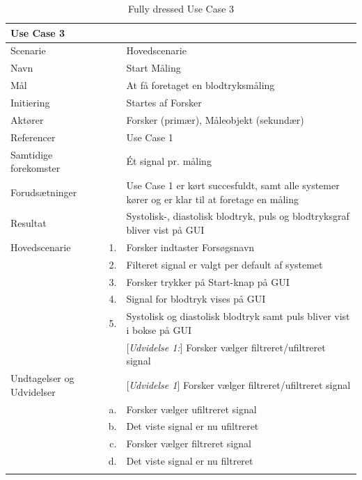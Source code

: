 \begin{longtabu} to  %
    {\large \textbf{Use Case 3}} && \\
    \toprule
    Scenarie && Hovedscenarie\\
    Navn && Start Måling\\
    Mål && At få foretaget en blodtryksmåling\\
    Initiering && Startes af Forsker\\
    Aktører && Forsker (primær), Måleobjekt (sekundær)\\
    Referencer && Use Case 1\\
    Samtidige forekomster  && Ét signal pr. måling\\
    Forudsætninger && Use Case 1 er kørt succesfuldt, samt alle systemer kører og er klar til at foretage en måling\\ 
    Resultat && Systolisk-, diastolisk blodtryk, puls og blodtryksgraf bliver vist på GUI\\ \midrule
    Hovedscenarie &    1. &		Forsker indtaster Forsøgsnavn\\[-1ex]
    &     2. & 	Filteret signal er valgt per default af systemet\\	 	
                &    3. & Forsker trykker på Start-knap på GUI\\[-1ex]
                &    4. & Signal for blodtryk vises på GUI\\[-1ex]
                &    5. & Systolisk og diastolisk blodtryk samt puls bliver vist i bokse på GUI\\ 
                &    & [\textit{Udvidelse 1:}] Forsker vælger filtreret/ufiltreret signal	\\ \midrule
                
    Undtagelser og Udvidelser && [\textit{Udvidelse 1}]	Forsker vælger filtreret/ufiltreret signal\\ 
    &	a. & Forsker vælger ufiltreret signal\\
    &   b. & Det viste signal er nu ufiltreret \\
    & 	c. & Forsker vælger filtreret signal \\
    &	d. & Det viste signal er nu filtreret \\   
    \bottomrule
\caption{Fully dressed Use Case 3}
\label{UC3}
\end{longtabu}


